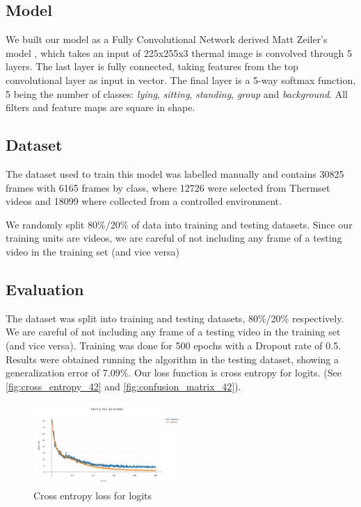 \documentclass[oneside, twocolumn]{article}
\begin{document}
\subsection{Model}

We built our model as a Fully Convolutional Network derived Matt Zeiler's model \cite{zeiler-2014}, which takes an input of 225x255x3 thermal image is convolved through 5 layers. The last layer is fully connected, taking features from the top convolutional layer as input in vector. The final layer is a 5-way softmax function, 5 being the number of classes: \textit{lying}, \textit{sitting}, \textit{standing}, \textit{group} and \textit{background}. All filters and feature maps are square in shape.

\subsection{Dataset}
The dataset used to train this model was labelled manually and contains 30825 frames with 6165 frames by class, where 12726 were selected from Thermset videos and 18099 where collected from a controlled environment.

We randomly split 80\%/20\% of data into training and testing datasets. Since our training units are videos, we are careful of not including any frame of a testing video in the training set (and vice versa)

\subsection{Evaluation}
The dataset was split   into training and testing datasets,  80\%/20\%   respectively. We are careful of not including any frame of a testing video in the training set (and vice versa). Training was done for 500 epochs with a Dropout rate of 0.5. Results were obtained running the algorithm in the testing dataset, showing a  generalization  error of  7.09\%. Our loss function is cross entropy for logits. (See \autoref{fig:cross_entropy_42} and \autoref{fig:confusion_matrix_42}).

\begin{figure}
  \centering
    \includegraphics[width=0.5\textwidth]{images/loss_42.png}
  \caption{Cross entropy loss for logits}
  \label{fig:cross_entropy_42}
\end{figure}
\end{document}
